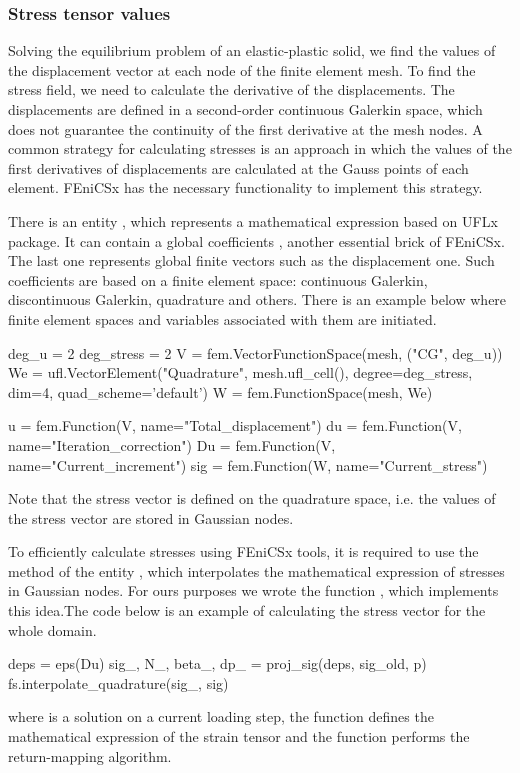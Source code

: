 \documentclass[12pt]{article}
\begin{document}
\subsubsection{Stress tensor values}

Solving the equilibrium problem of an elastic-plastic solid, we find the values of the displacement vector at each node of the finite element mesh. To find the stress field, we need to calculate the derivative of the displacements. The displacements are defined in a second-order continuous Galerkin space, which does not guarantee the continuity of the first derivative at the mesh nodes. A common strategy for calculating stresses is an approach in which the values of the first derivatives of displacements are calculated at the Gauss points of each element. FEniCSx has the necessary functionality to implement this strategy. 

There is an entity , which represents a mathematical expression based on UFLx package. It can contain a global coefficients , another essential brick of FEniCSx. The last one represents global finite vectors such as the displacement one. Such coefficients are based on a finite element space: continuous Galerkin, discontinuous Galerkin, quadrature and others. There is an example below where finite element spaces and variables associated with them are initiated.

\begin{pythoncode}
    deg_u = 2
    deg_stress = 2
    V = fem.VectorFunctionSpace(mesh, ("CG", deg_u))
    We = ufl.VectorElement("Quadrature", mesh.ufl_cell(), degree=deg_stress, dim=4, quad_scheme='default')
    W = fem.FunctionSpace(mesh, We)

    u = fem.Function(V, name="Total_displacement")
    du = fem.Function(V, name="Iteration_correction")
    Du = fem.Function(V, name="Current_increment")
    sig = fem.Function(W, name="Current_stress")
\end{pythoncode}
Note that the stress vector  is defined on the quadrature space, i.e. the values of the stress vector are stored in Gaussian nodes. 

To efficiently calculate stresses using FEniCSx tools, it is required to use the  method of the entity , which interpolates the mathematical expression of stresses in Gaussian nodes. For ours purposes we wrote the function , which implements this idea.The code below is an example of calculating the stress vector for the whole domain.
\begin{pythoncode}
    deps = eps(Du)
    sig_, N_, beta_, dp_ = proj_sig(deps, sig_old, p)
    fs.interpolate_quadrature(sig_, sig)
\end{pythoncode}
where  is a solution on a current loading step, the function  defines the mathematical expression of the strain tensor and the function  performs the return-mapping algorithm.
\end{document}
